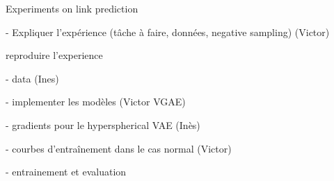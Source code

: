 \begin{frame}{Experiments on link prediction}

    - Expliquer l'expérience (tâche à faire, données, negative sampling) (Victor)

    reproduire l'experience 
  
    - data (Ines)
  
    - implementer les modèles (Victor VGAE)
    
    - gradients pour le hyperspherical VAE (Inès)
    
    - courbes d'entraînement dans le cas normal (Victor)
  
    - entrainement et evaluation 
  
  \end{frame}
